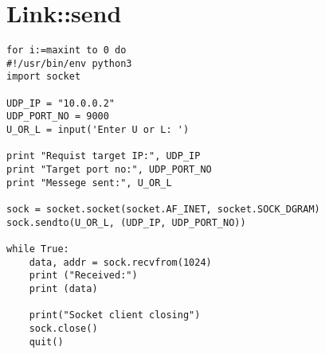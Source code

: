 \graphicspath{{Chapters/Barnevogn/}}

\chapter{Link::send}

\lstset{language=Python}          %

\begin{lstlisting}[frame=single]  % Start your code-block
for i:=maxint to 0 do
#!/usr/bin/env python3
import socket
 
UDP_IP = "10.0.0.2"
UDP_PORT_NO = 9000
U_OR_L = input('Enter U or L: ')

print "Requist target IP:", UDP_IP
print "Target port no:", UDP_PORT_NO
print "Messege sent:", U_OR_L
 
sock = socket.socket(socket.AF_INET, socket.SOCK_DGRAM)
sock.sendto(U_OR_L, (UDP_IP, UDP_PORT_NO))

while True:
	data, addr = sock.recvfrom(1024)
	print ("Received:")
	print (data)

	print("Socket client closing")
	sock.close()
	quit()
\end{lstlisting}



